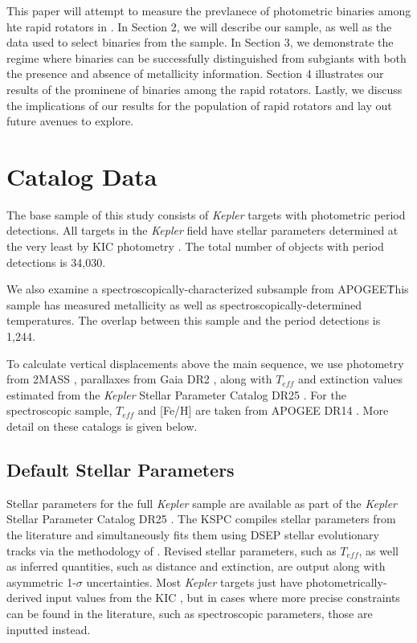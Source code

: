 \documentclass[manuscript]{aastex6}
\newcommand{\Kepler}{\mbox{\textit{Kepler}}}
\newcommand{\Teff}{\ensuremath{T_{eff}}}
\begin{document}
This paper will attempt to measure the prevlanece of photometric binaries among
hte rapid rotators in \citep{McQuillan14}. In Section 2, we will describe our
sample, as well as the data used to select binaries from the sample. In Section
3, we demonstrate the regime where binaries can be successfully distinguished
from subgiants with both the presence and absence of metallicity information.
Section 4 illustrates our results of the prominene of binaries among the rapid
rotators. Lastly, we discuss the implications of our results for the population
of rapid rotators and lay out future avenues to explore.

\section{Catalog Data}
\label{sec:data}

The base sample of this study consists of \Kepler{} targets with photometric
period detections. All targets in the \Kepler{} field have stellar parameters
determined at the very least by KIC photometry \citep{Brown11}. The total
number of objects with period detections is 34,030.

We also examine a spectroscopically-characterized subsample from APOGEE\. This
sample has measured metallicity as well as spectroscopically-determined
temperatures. The overlap between this sample and the \citet{McQuillan14}
period detections is 1,244.

To calculate vertical displacements above the main sequence, we use photometry
from 2MASS \citep{Skrutskie06}, parallaxes from Gaia DR2 \citep{Gaia18}, along
with \Teff{} and extinction values estimated from the \Kepler{} Stellar 
Parameter Catalog DR25 \citep[KSPC]{Huber14,Mathur17}. For the spectroscopic sample,
\Teff{} and [Fe/H] are taken from APOGEE DR14 \citep{Abolfathi18}. More detail
on these catalogs is given below.

\subsection{Default Stellar Parameters}

Stellar parameters for the full \Kepler{} sample are available as part of the
\Kepler{} Stellar Parameter Catalog DR25 \citep[KSPC]{Mathur17}. The KSPC
compiles stellar parameters from the literature and simultaneously fits them
using DSEP \citep{Dotter08} stellar evolutionary tracks via the methodology of
\citet{Huber14}. Revised stellar parameters, such as \Teff, as well as inferred
quantities, such as distance and extinction, are output along with asymmetric
1-\(\sigma\) uncertainties. Most \Kepler{} targets just have
photometrically-derived input values from the KIC \citep{Brown11}, but in cases
where more precise constraints can be found in the literature, such as
spectroscopic parameters, those are inputted instead.
\end{document}
